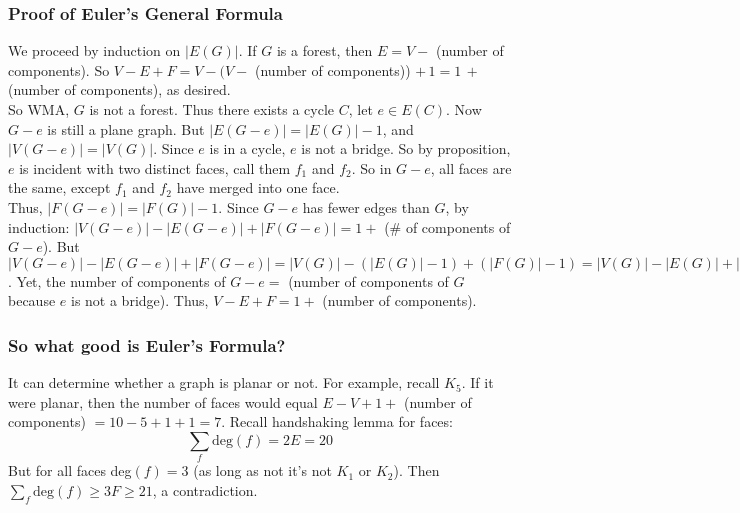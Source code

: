 \documentclass{report}
\begin{document}
\subsubsection{Proof of Euler's General Formula}
We proceed by induction on $\vert E(G)\vert$. If $G$ is a forest, then $E=V - $ (number of components). So $V-E+F = V - (V - $ (number of components)) $ + \,1 = 1\, + $ (number of components), as desired.\\
So WMA, $G$ is not a forest. Thus there exists a cycle $C$, let $e \in E(C)$. Now $G-e$ is still a plane graph. But $|E(G-e)| = |E(G)| -1$, and $|V(G-e)| = |V(G)|$. Since $e$ is in a cycle, $e$ is not a bridge. So by proposition, $e$ is incident with two distinct faces, call them $f_1$ and $f_2$. So in $G-e$, all faces are the same, except $f_1$ and $f_2$ have merged into one face.\\
Thus, $|F(G-e)| = |F(G)| - 1$. Since $G-e$ has fewer edges than $G$, by induction: $|V(G-e)| - |E(G-e)| + |F(G-e)| = 1 +$ (\# of components of $G-e$). But $|V(G-e)| - |E(G-e)| + |F(G-e)| = |V(G)| - (|E(G)| - 1) + (|F(G)|-1) = |V(G)| - |E(G)| + |F(G)|$. Yet, the number of components of $G-e =$ (number of components of $G$ because $e$ is not a bridge). Thus, $V-E+F = 1+$ (number of components).
\subsubsection{So what good is Euler's Formula?}
It can determine whether a graph is planar or not. For example, recall $K_5$. If it were planar, then the number of faces would equal $E - V + 1 +$ (number of components) $= 10 - 5 + 1 + 1 = 7$.
Recall handshaking lemma for faces:
$$\sum_f \mathrm{deg}(f) = 2E = 20$$
But for all faces deg$(f) = 3$ (as long as not it's not $K_1$ or $K_2$). Then $\displaystyle \sum_f \mathrm{deg}(f) \geq 3F \geq 21$, a contradiction.
\end{document}
